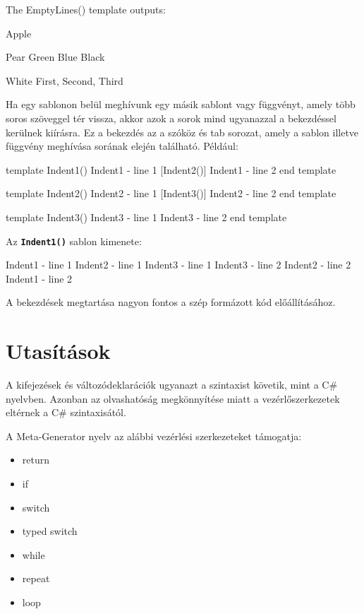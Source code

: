 \documentclass[12pt, a4paper]{report}
\newcommand{\ff}[1]{\textbf{\texttt{#1}}}
\begin{document}
The EmptyLines() template outputs:

\begin{textcode}
  Apple

  Pear
  Green
  Blue
  Black

  White
  First, Second, Third
\end{textcode}

Ha egy sablonon belül meghívunk egy másik sablont vagy függvényt, amely több soros szöveggel tér vissza, akkor azok a sorok mind ugyanazzal a bekezdéssel kerülnek kiírásra. Ez a bekezdés az a szóköz és tab sorozat, amely a sablon illetve függvény meghívása sorának elején található. Például:

\begin{mgencode}
template Indent1()
  Indent1 - line 1
  [Indent2()]
  Indent1 - line 2
end template

template Indent2()
  Indent2 - line 1
  [Indent3()]
  Indent2 - line 2
end template

template Indent3()
  Indent3 - line 1
  Indent3 - line 2
end template
\end{mgencode}

Az \ff{Indent1()} sablon kimenete:

\begin{textcode}
  Indent1 - line 1
    Indent2 - line 1
      Indent3 - line 1
      Indent3 - line 2
    Indent2 - line 2
  Indent1 - line 2
\end{textcode}

A bekezdések megtartása nagyon fontos a szép formázott kód előállításához.

\section{Utasítások}

A kifejezések és változódeklarációk ugyanazt a szintaxist követik, mint a C\# nyelvben. Azonban az olvashatóság megkönnyítése miatt a vezérlőszerkezetek eltérnek a C\# szintaxisától.

A Meta-Generator nyelv az alábbi vezérlési szerkezeteket támogatja:
\begin{itemize}
	\item return
	\item if
	\item switch
	\item typed switch
	\item while
	\item repeat
	\item loop
\end{itemize}
\end{document}
